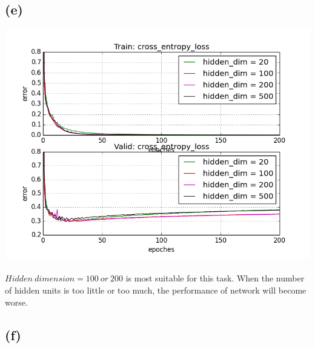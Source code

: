 \documentclass[twoside]{article}
\begin{document}
\subsection{(e)}
\includegraphics[width=0.5\linewidth]{images/problem_e}
\paragraph{}
$Hidden\ dimension = 100\ or\ 200$ is most suitable for this task. When the number of hidden units is too little or too much, the performance of network will become worse.

\subsection{(f)}
\end{document}
